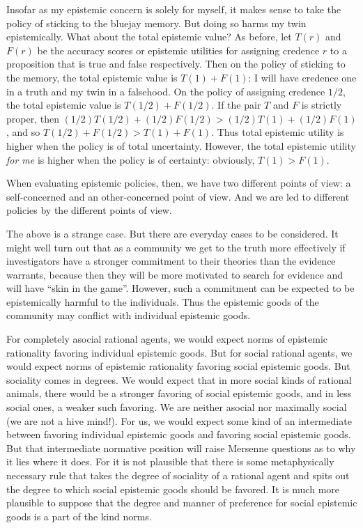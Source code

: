 Insofar as my epistemic concern is solely for myself, it makes sense to take the policy of sticking to the bluejay memory.
But doing so harms my twin epistemically. What about the total epistemic value? As before, let $T(r)$ and $F(r)$ be the accuracy 
scores or epistemic utilities for assigning credence $r$ to a proposition that is true and false respectively. Then on the policy 
of sticking to the memory, the total epistemic value is $T(1)+F(1)$: I will have credence one in a truth and my twin in a falsehood.
On the policy of assigning credence $1/2$, the total epistemic value is $T(1/2)+F(1/2)$. If the pair $T$ and $F$ is strictly proper,
then $(1/2)T(1/2)+(1/2)F(1/2) > (1/2)T(1)+(1/2)F(1)$, and so $T(1/2)+F(1/2)>T(1)+F(1)$. Thus total epistemic utility is higher
when the policy is of total uncertainty. However, the total epistemic utility \textit{for me} is higher when the policy is of
certainty: obviously, $T(1)>F(1)$. 

When evaluating epistemic policies, then, we have two different points of view: a self-concerned and an other-concerned 
point of view. And we are led to different policies by the different points of view.

The above is a strange case. But there are everyday cases to be considered. It might well turn out that as a community we 
get to the truth more effectively if investigators have a stronger commitment to their theories than the evidence warrants,
because then they will be more motivated to search for evidence and will have ``skin in the game''. However, such a commitment
can be expected to be epistemically harmful to the individuals. Thus the epistemic goods of the community may conflict with 
individual epistemic goods. 

For completely asocial rational agents, we would expect norms of epistemic rationality favoring individual epistemic goods. But for 
social rational agents, we would expect norms of epistemic rationality favoring social epistemic goods. But sociality comes in degrees.
We would expect that in more social kinds of rational animals, there would be a stronger favoring of social epistemic goods, and in
less social ones, a weaker such favoring. We are neither asocial nor maximally social (we are not a hive mind!). For us, we would expect
some kind of an intermediate between favoring individual epistemic goods and favoring social epistemic goods. But that intermediate 
normative position will raise Mersenne questions as to why it lies where it does. For it is not plausible that there is some 
metaphysically necessary rule that takes the degree of sociality of a rational agent and spits out the degree to which social epistemic 
goods should be favored. It is much more plausible to suppose that the degree and manner of preference for social epistemic goods is 
a part of the kind norms. 

